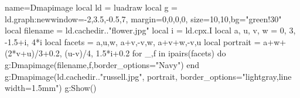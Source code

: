 \begin{luadraw}{name=Dmapimage}
local ld = luadraw
local g = ld.graph:new{window={-2,3.5,-0.5,7}, margin={0,0,0,0}, size={10,10},bg="green!30"}
local filename = ld.cachedir.."flower.jpg"
local i = ld.cpx.I
local a, u, v, w = 0, 3, -1.5+i, 4*i
local facets = {{a,u,w}, {a+v,-v,w}, {a+v+w,-v,u} }
local portrait = {a+w+(2*v+u)/3+0.2, (u-v)/4, 1.5*i+0.2}
for _,f in ipairs(facets) do
    g:Dmapimage(filename,f,{border_options="Navy"})
end
g:Dmapimage(ld.cachedir.."russell.jpg", portrait, {border_options="lightgray,line width=1.5mm"})
g:Show()
\end{luadraw}
